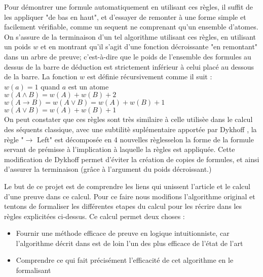 Pour d\'emontrer une formule automatiquement en utilisant ces r\`egles, il suffit de les appliquer "de bas en haut", et d'essayer de remonter \`a une forme simple et facilement v\'erifiable, comme un sequent ne comprenant qu'un ensemble d'atomes.
On s'assure de la terminaison d'un tel algorithme utilisant ces r\`egles, en utilisant un poids $w$ et en montrant qu'il s'agit d'une fonction d\'ecroissante "en remontant" dans un arbre de preuve; c'est-\`a-dire que le poids de l'ensemble des formules au dessus de la barre de d\'eduction est strictement inférieur à celui plac\'e au dessous de la barre. La fonction $w$ est d\'efinie r\'ecursivement comme il suit : \\
$w(a) = 1$ quand $a$ est un atome \\
$w(A \land B) = w(A) + w(B) + 2 $ \\
$w(A \to B ) = w(A \lor B) = w(A) + w(B) + 1$\\
$w(A \lor B) = w(A) + w(B) + 1$\\

On peut constater que ces r\`egles sont tr\`es similaire \`a celle utilis\`ee dans le calcul des s\'equents classique, avec une subtilit\`e supl\'ementaire apport\'ee par Dykhoff \cite{dikh}, la r\`egle "$\to$ Left" est d\'ecompos\'ee en 4 nouvelles r\`eglesselon la forme de la formule servant de pr\'emisse à l'implication à laquelle la r\`egles est appliqu\'ee. Cette modification de Dykhoff permet d'\'eviter la cr\'eation de copies de formules, et ainsi d'assurer la terminaison (gr\^ace \`a l'argument du poids d\'ecroissant.)

Le but de ce projet est de comprendre les liens qui unissent l'article \cite{intuit2015} et le calcul d'une preuve dans ce calcul. Pour ce faire nous modifions l'algorithme original et tentons de formaliser les diff\'erentes etapes du calcul pour les r\'ecrire dans les r\`egles explicit\'ees ci-dessus. Ce calcul permet deux choses :

\begin{itemize}
\item Fournir une m\'ethode efficace de preuve en logique intuitionniste, car l'algorithme d\'ecrit dans \cite{intuit2015} est de loin l'un des plus efficace de l'\'etat de l'art
\item Comprendre ce qui fait pr\'ecis\'ement l'efficacit\'e de cet algorithme en le formalisant

\end{itemize}
